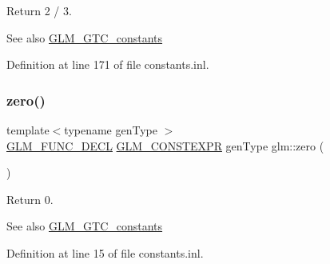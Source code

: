 Return 2 / 3. \begin{DoxySeeAlso}{See also}
\mbox{\hyperlink{group__gtc__constants}{G\+L\+M\+\_\+\+G\+T\+C\+\_\+constants}} 
\end{DoxySeeAlso}


Definition at line 171 of file constants.\+inl.

\mbox{\label{group__gtc__constants_ga788f5a421fc0f40a1296ebc094cbaa8a}} 
\subsubsection{\texorpdfstring{zero()}{zero()}}
{\footnotesize\ttfamily template$<$typename gen\+Type $>$ \\
\mbox{\hyperlink{setup_8hpp_ab2d052de21a70539923e9bcbf6e83a51}{G\+L\+M\+\_\+\+F\+U\+N\+C\+\_\+\+D\+E\+CL}} \mbox{\hyperlink{setup_8hpp_a08b807947b47031d3a511f03f89645ad}{G\+L\+M\+\_\+\+C\+O\+N\+S\+T\+E\+X\+PR}} gen\+Type glm\+::zero (\begin{DoxyParamCaption}{ }\end{DoxyParamCaption})}

Return 0. \begin{DoxySeeAlso}{See also}
\mbox{\hyperlink{group__gtc__constants}{G\+L\+M\+\_\+\+G\+T\+C\+\_\+constants}} 
\end{DoxySeeAlso}


Definition at line 15 of file constants.\+inl.

